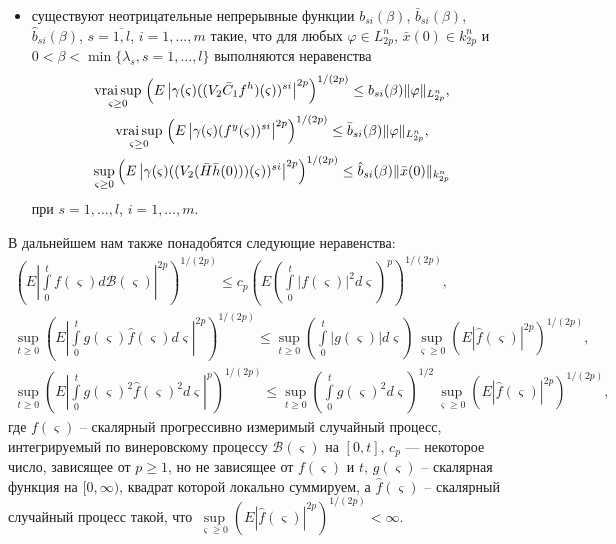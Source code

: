 \begin{itemize}
    \item  существуют неотрицательные непрерывные функции $b_{si}(\beta)$,
    $\bar b_{si}(\beta)$, $\hat b_{si}(\beta)$, $s= \overline{1, l}$, $i= 1,
    \dots, m$ такие,  что для любых $\varphi \in L^n_{2p}$, $\bar x(0) \in
    k_{2p}^n$ и  $0<\beta < \min \{\lambda _s, s = 1, \dots, l \}$
    выполняются неравенства
     \begin{gather*}
        \mathrel {\mathop
     {\operatorname*{vrai} \sup} \limits _{\varsigma \geq 0}} \left(E\left |\gamma (\varsigma )
    ((V_2 \bar C_1 f^h)(\varsigma))^{si}\right |^{2p}\right)^{1/(2p)}
    \leq b_{si}(\beta) \|\varphi \|_{L^n_{2p}}, \\
    \mathrel {\mathop
     {\operatorname*{vrai} \sup} \limits _{\varsigma \geq 0} }\left(E\left|\gamma (\varsigma )
    (f^y(\varsigma ))^{si}\right|^{2p}\right)^{1/(2p)}\leq \bar
    b_{si}(\beta) \|\varphi \|_{L^n_{2p}},\\
    \sup \limits _{\varsigma \geq 0}\left (E\left |\gamma (\varsigma)
    ((V_2(\bar H \bar h(0)))(\varsigma))^{si}\right |^{2p}\right
    )^{1/(2p)} \leq \hat b_{si}(\beta)\|\bar x(0)\|_{k^n_{2p}}
    \end{gather*}
    при $s = 1,\dots,l$, $i = 1, \dots, m$.
\end{itemize}

В дальнейшем нам также понадобятся следующие неравенства:
 \begin{gather*}
    \left (E\left |\int \limits _0^tf(\varsigma )d\mathcal B(\varsigma
    )\right |^{2p}\right )^{1/(2p)} \leq c_p \left (E\left (\int \limits
    _0^t|f(\varsigma )|^2d\varsigma\right )^p\right )^{1/(2p)},
    \\
     \sup \limits _{t \geq 0}\left(E\left|\int \limits
     _0^tg(\varsigma)\hat f(\varsigma)d\varsigma\right|^{2p}\right)^{1/(2p)}
     \leq \sup \limits _{t \geq 0}\left (\int \limits
     _0^t|g(\varsigma)|d\varsigma\right )
     \sup \limits _{\varsigma \geq
     0}\left (E\left |\hat f(\varsigma)\right |^{2p}\right )^{1/(2p)},
     \\
\sup \limits _{t \geq 0}\left(E|\int \limits
 _0^tg(\varsigma)^2\hat f(\varsigma)^2d\varsigma|^{p}\right)^{1/(2p)} \leq
 \sup \limits _{t \geq 0}\left(\int \limits
 _0^tg(\varsigma)^2d\varsigma\right)^{1/2}\sup \limits _{\varsigma
 \geq 0}\left (E\left |\hat f(\varsigma)\right |^{2p}\right )^{1/(2p)},
\end{gather*}
где $f(\varsigma )$ -- скалярный прогрессивно измеримый случайный
процесс, интегрируемый по винеровскому процессу  $\mathcal
B(\varsigma )$ на $[0, t]$, $c_p$ --- некоторое число, зависящее от
$p\ge 1$, но не зависящее от $f(\varsigma )$ и $t$, $g(\varsigma)$
-- скалярная функция на $[0,
 \infty)$, квадрат которой локально суммируем, а $\hat f(\varsigma)$ --
скалярный случайный процесс такой, что $\sup \limits _{\varsigma
\geq 0}\left (E\left |\hat f(\varsigma)\right |^{2p}\right
)^{1/(2p)} < \infty$.

